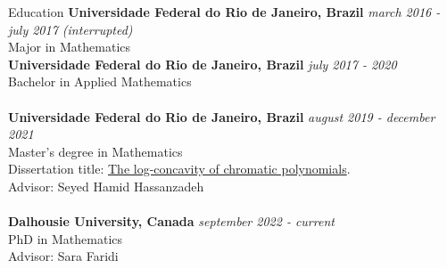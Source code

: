 \documentclass{resume} %
\begin{document}

\begin{rSection}{Education}
{\bf Universidade Federal do Rio de Janeiro, Brazil} \hfill {\em march 2016 - july 2017 (interrupted)} 
\\ Major in Mathematics\\
{\bf Universidade Federal do Rio de Janeiro, Brazil} \hfill {\em july 2017 - 2020} 
\\ Bachelor in Applied Mathematics
\\
\\{\bf Universidade Federal do Rio de Janeiro, Brazil} \hfill {\em august 2019 - december 2021} 
\\ Master's degree in Mathematics
\\ Dissertation title: \href{https://hollebenthiago.github.io/msc/main.pdf}{The log-concavity of chromatic polynomials}.
\\ Advisor: Seyed Hamid Hassanzadeh
\\
\\{\bf Dalhousie University, Canada} \hfill {\em september 2022 - current} 
\\ PhD in Mathematics
\\ Advisor: Sara Faridi

\end{rSection}



\end{document}
